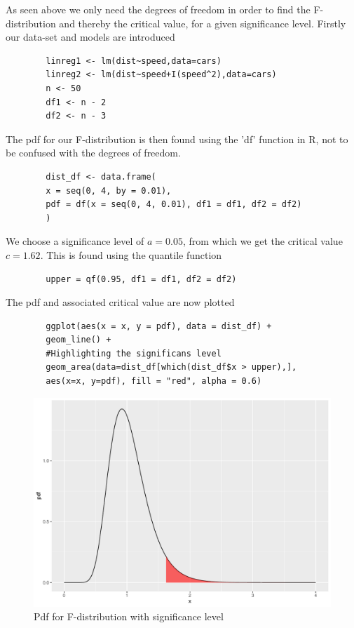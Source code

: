\begin{example}
    As seen above we only need the degrees of freedom in order to find the F-distribution and thereby the critical value, for a given significance level.
    Firstly our data-set and models are introduced
    
    \begin{lstlisting}
        linreg1 <- lm(dist~speed,data=cars)
        linreg2 <- lm(dist~speed+I(speed^2),data=cars)
        n <- 50
        df1 <- n - 2
        df2 <- n - 3
    \end{lstlisting}
    
    The pdf for our F-distribution is then found using the 'df' function in R, not to be confused with the degrees of freedom. 
    
    \begin{lstlisting}
        dist_df <- data.frame(
        x = seq(0, 4, by = 0.01),
        pdf = df(x = seq(0, 4, 0.01), df1 = df1, df2 = df2)
        )
    \end{lstlisting}
    
    We choose a significance level of $a = 0.05$, from which we get the critical value $c=1.62$. This is found using the quantile function
    
    \begin{lstlisting}
        upper = qf(0.95, df1 = df1, df2 = df2)
    \end{lstlisting}
    
    The pdf and associated critical value are now plotted
    
    \begin{lstlisting}
        ggplot(aes(x = x, y = pdf), data = dist_df) + 
        geom_line() +
        #Highlighting the significans level
        geom_area(data=dist_df[which(dist_df$x > upper),],
        aes(x=x, y=pdf), fill = "red", alpha = 0.6)
    \end{lstlisting}
    
    \begin{figure}[H]
        \centering
      \includegraphics[width = 1 \textwidth]{figures/Thea/Fdistsign.pdf}
      \caption{Pdf for F-distribution with significance level}
      \label{fig:my_label}
    \end{figure}
    

\end{example}

